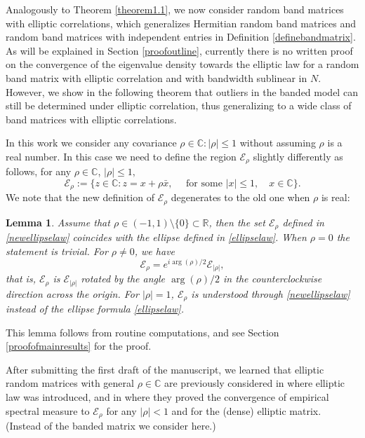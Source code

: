 \documentclass[11pt,reqno]{amsart}
\theoremstyle{plain}
\newtheorem{lemma}[theorem]{Lemma}
\theoremstyle{remark}
\numberwithin{equation}{section}
\begin{document}
Analogously to Theorem \ref{theorem1.1}, we now consider random band matrices with elliptic correlations, which generalizes Hermitian random band matrices and random band matrices with independent entries in Definition \ref{definebandmatrix}. As will be explained in Section \ref{proofoutline}, currently there is no written proof on the convergence of the eigenvalue density towards the elliptic law for a random band matrix with elliptic correlation and with bandwidth sublinear in $N$. However, we show in the following theorem that outliers in the banded model can still be determined under elliptic correlation, thus generalizing \cite{article1221} to a wide class of band matrices with elliptic correlations.

In this work we consider any covariance $\rho\in\mathbb{C}:|\rho|\leq 1$ without assuming $\rho$ is a real number. In this case we need to define the region $\mathcal{E}_\rho$ slightly differently as follows, for any $\rho\in\mathbb{C}$, $|\rho|\leq 1,$
\begin{equation}\label{newellipselaw}
\mathcal{E}_\rho:=\{z\in\mathbb{C}:z=x+\rho\bar{x},\quad \text{ for some }|x|\leq 1,\quad x\in\mathbb{C}\}.
\end{equation}
We note that the new definition of $\mathcal{E}_\rho$ degenerates to the old one when $\rho$ is real:
\begin{lemma}\label{triviallemmas}
    Assume that $\rho\in (-1,1)\setminus\{0\}\subset\mathbb{R}$, then the set $\mathcal{E}_\rho$ defined in \eqref{newellipselaw} coincides with the ellipse defined in \eqref{ellipselaw}. When $\rho=0$ the statement is trivial. For $\rho\neq0$, we have 
    $$
\mathcal{E}_\rho=e^{i\arg(\rho)/2}\mathcal{E}_{|\rho|},
    $$ that is, $\mathcal{E}_\rho$ is $\mathcal{E}_{|\rho|}$ rotated by the angle $\arg(\rho)/2$ in the counterclockwise direction across the origin. For $|\rho|=1$, $\mathcal{E}_{\rho}$ is understood through \eqref{newellipselaw} instead of the ellipse formula \eqref{ellipselaw}.
\end{lemma} 
This lemma follows from routine computations, and see Section \ref{proofofmainresults} for the proof. 

After submitting the first draft of the manuscript, we learned that elliptic random matrices with general $\rho\in\mathbb{C}$ are previously considered in \cite{girko1986elliptic} where elliptic law was introduced, and in \cite{gotze2015minimal} where they proved the convergence of empirical spectral measure to $\mathcal{E}_\rho$ for any $|\rho|<1$ and for the (dense) elliptic matrix. (Instead of the banded matrix we consider here.) 
\end{document}
